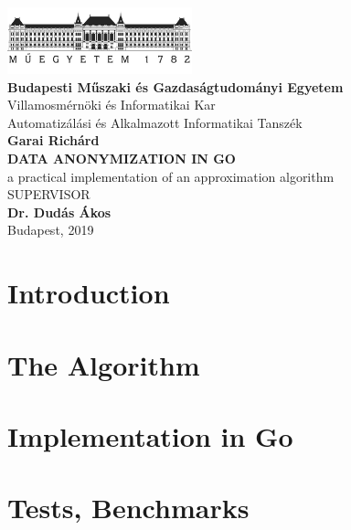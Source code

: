 \documentclass[a4paper,12pt,twoside]{report}
\begin{document}
\begin{titlepage}
	\begin{center}
		\includegraphics[width=0.4\textwidth]{bme-logo.png} \\
		\textbf{Budapesti Műszaki és Gazdaságtudományi Egyetem} \\
		Villamosmérnöki és Informatikai Kar \\
		Automatizálási és Alkalmazott Informatikai Tanszék \\
		\vspace{7cm}
		\Large \textbf{Garai Richárd} \\
		\vspace{0.2cm}
		\LARGE \MakeUppercase{\textbf{Data Anonymization in Go}} \\
		\vspace{0.1cm}
		\large a practical implementation of an approximation algorithm \\
		\vspace{5cm}
		\MakeUppercase{Supervisor} \\
		\textbf{Dr. Dudás Ákos} \\
		\vspace{1cm}
		Budapest, 2019
	\end{center}
 \end{titlepage}

\tableofcontents

\pagestyle{fancy}

\chapter{Introduction}


\chapter{The Algorithm}


\chapter{Implementation in Go}


\chapter{Tests, Benchmarks}

\end{document}
